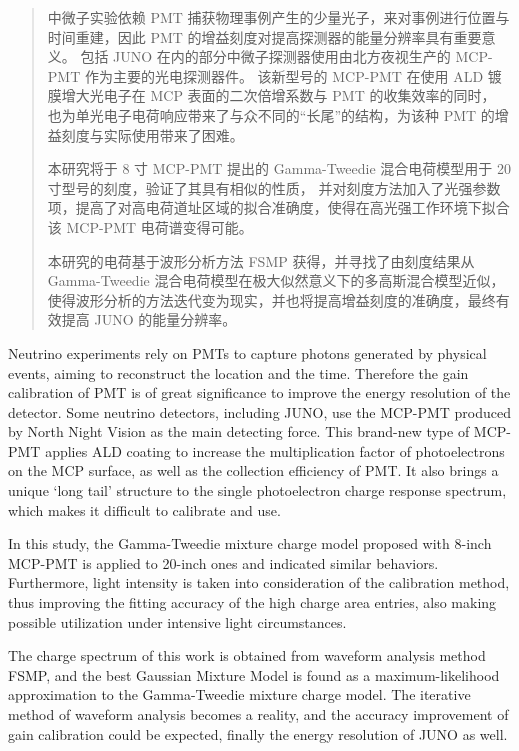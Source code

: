 

\begin{abstract}
  中微子实验依赖 PMT 捕获物理事例产生的少量光子，来对事例进行位置与时间重建，因此 PMT 的增益刻度对提高探测器的能量分辨率具有重要意义。
  包括 JUNO 在内的部分中微子探测器使用由北方夜视生产的 MCP-PMT 作为主要的光电探测器件。
  该新型号的 MCP-PMT 在使用 ALD 镀膜增大光电子在 MCP 表面的二次倍增系数与 PMT 的收集效率的同时，
  也为单光电子电荷响应带来了与众不同的“长尾”的结构，为该种 PMT 的增益刻度与实际使用带来了困难。

  本研究将于 8 寸 MCP-PMT 提出的 Gamma-Tweedie 混合电荷模型用于 20 寸型号的刻度，验证了其具有相似的性质，
  并对刻度方法加入了光强参数项，提高了对高电荷道址区域的拟合准确度，使得在高光强工作环境下拟合该 MCP-PMT 电荷谱变得可能。
  
  本研究的电荷基于波形分析方法 FSMP 获得，并寻找了由刻度结果从 Gamma-Tweedie 混合电荷模型在极大似然意义下的多高斯混合模型近似，
  使得波形分析的方法迭代变为现实，并也将提高增益刻度的准确度，最终有效提高 JUNO 的能量分辨率。

\end{abstract}

\begin{abstract*}
    Neutrino experiments rely on PMTs to capture photons generated by physical events, aiming to reconstruct the location and the time. 
    Therefore the gain calibration of PMT is of great significance to improve the energy resolution of the detector.
    Some neutrino detectors, including JUNO, use the MCP-PMT produced by North Night Vision as the main detecting force.
    This brand-new type of MCP-PMT applies ALD coating to increase the multiplication factor of photoelectrons on the MCP surface, as well as the collection efficiency of PMT.
    It also brings a unique `long tail' structure to the single photoelectron charge response spectrum, 
    which makes it difficult to calibrate and use.

    In this study, the Gamma-Tweedie mixture charge model proposed with 8-inch MCP-PMT is applied to 20-inch ones and indicated similar behaviors.
    Furthermore, light intensity is taken into consideration of the calibration method, 
    thus improving the fitting accuracy of the high charge area entries,
    also making possible utilization under intensive light circumstances.

    The charge spectrum of this work is obtained from waveform analysis method FSMP, 
    and the best Gaussian Mixture Model is found as a maximum-likelihood approximation to the Gamma-Tweedie mixture charge model.
    The iterative method of waveform analysis becomes a reality, 
    and the accuracy improvement of gain calibration could be expected, finally the energy resolution of JUNO as well.

\end{abstract*}
